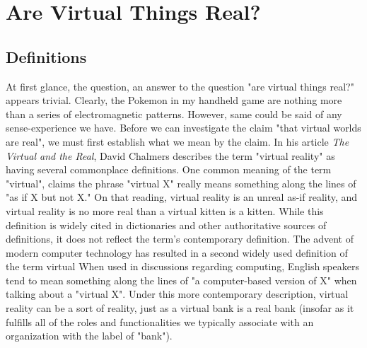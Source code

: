 \chapter{Are Virtual Things Real?}
\section{Definitions}
At first glance, the question, an answer to the question "are virtual things real?" appears trivial. Clearly, the Pokemon in my handheld game are nothing more than a series of electromagnetic patterns. However, same could be said of any sense-experience we have. 
Before we can investigate the claim "that virtual worlds are real", we must first establish what we mean by the claim. In his article \textit{The Virtual and the Real}, David Chalmers describes the term "virtual reality" as having several commonplace definitions. One common meaning of the term "virtual", claims the phrase "virtual X" really means something along the lines of "as if X but not X."  On that reading, virtual reality is an unreal as-if reality, and virtual reality is no more real than a virtual kitten is a kitten. \cite{ChalmersVR} While this definition is widely cited in dictionaries and other authoritative sources of definitions, it does not reflect the term's contemporary definition. The advent of modern computer technology has resulted in a second widely used definition of the term virtual When used in discussions regarding computing, English speakers  tend to mean something along the lines of "a computer-based version of X" when talking about a "virtual X". Under this more contemporary description, virtual reality can be a sort of reality, just as a virtual bank is a real bank (insofar as it fulfills all of the roles and functionalities we typically associate with an organization with the label of "bank"). 
\newline 

